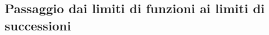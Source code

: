 \subsection{Passaggio dai limiti di funzioni ai limiti di successioni}
\label{sec:esercizi-limiti-limiti-di-successioni}
